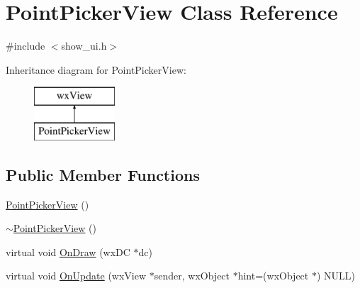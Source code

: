 \hypertarget{a00115}{\section{Point\-Picker\-View Class Reference}
\label{a00115}
}


{\ttfamily \#include $<$show\-\_\-ui.\-h$>$}

Inheritance diagram for Point\-Picker\-View\-:\begin{figure}[H]
\begin{center}
\leavevmode
\includegraphics[height=2.000000cm]{a00115}
\end{center}
\end{figure}
\subsection*{Public Member Functions}
\begin{DoxyCompactItemize}
\item 
\hyperlink{a00115_acfd8acbcd9fbb07e7efaaf51f87e142c}{Point\-Picker\-View} ()
\item 
\hyperlink{a00115_a48bda08c2b08bb3fa836c02243394b09}{$\sim$\-Point\-Picker\-View} ()
\item 
virtual void \hyperlink{a00115_a26c895fd5c4e888ec2224c8f3e1d2272}{On\-Draw} (wx\-D\-C $\ast$dc)
\item 
virtual void \hyperlink{a00115_a9e99bfe9286049810207ee934398072d}{On\-Update} (wx\-View $\ast$sender, wx\-Object $\ast$hint=(wx\-Object $\ast$) N\-U\-L\-L)
\end{DoxyCompactItemize}


